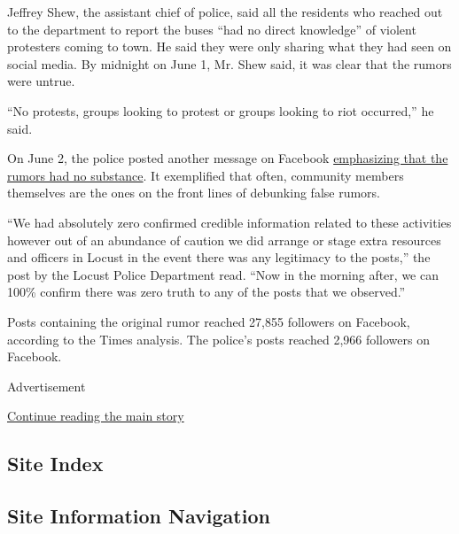 Jeffrey Shew, the assistant chief of police, said all the residents who
reached out to the department to report the buses ``had no direct
knowledge'' of violent protesters coming to town. He said they were only
sharing what they had seen on social media. By midnight on June 1, Mr.
Shew said, it was clear that the rumors were untrue.

``No protests, groups looking to protest or groups looking to riot
occurred,'' he said.

On June 2, the police posted another message on Facebook
\href{https://www.facebook.com/permalink.php?story_fbid=3051048361624116\&id=971105932951713\&__xts__\%5B0\%5D=68.ARDOEJsYdf3LZ57Mi_zK-u33tmrlZaw_x9KMCh5_NzQXPBb1nuyBH6YVwtdTbLc8YVnQGAkpd25IIKuPhL2W93GP3WSmtImjE-1swyUdUauEgSINmBVt4xHFgS4JWicuyCMHHwGWzfbB46xQBUCDSjvs3vChZs9S6WW5U0zrf_BHsPe-X0MAcnm0mPxIoOMRB3Uw21GLz0B2PN-leSVawzpWWdAV11WD5kmnT5IMPIE-wbI0FDSmdEVilltF7ZwEcUSwuss1EryU3EwDjblvWXFrTxLYJP-6szS5Q431m1JNc8Cu7P0Pc8s_mu6ba17ruAe8dpWtD16Yejh9g9Bf_w\&__tn__=-R}{emphasizing
that the rumors had no substance}. It exemplified that often, community
members themselves are the ones on the front lines of debunking false
rumors.

``We had absolutely zero confirmed credible information related to these
activities however out of an abundance of caution we did arrange or
stage extra resources and officers in Locust in the event there was any
legitimacy to the posts,'' the post by the Locust Police Department
read. ``Now in the morning after, we can 100\% confirm there was zero
truth to any of the posts that we observed.''

Posts containing the original rumor reached 27,855 followers on
Facebook, according to the Times analysis. The police's posts reached
2,966 followers on Facebook.

Advertisement

\protect\hyperlink{after-bottom}{Continue reading the main story}

\hypertarget{site-index}{%
\subsection{Site Index}\label{site-index}}

\hypertarget{site-information-navigation}{%
\subsection{Site Information
Navigation}\label{site-information-navigation}}

